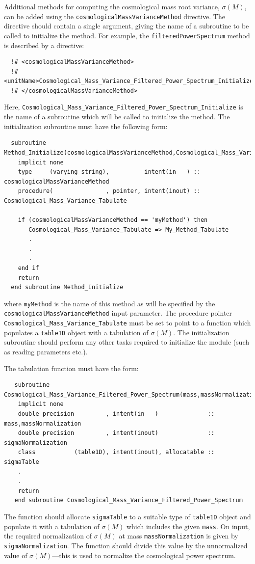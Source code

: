 Additional methods for computing the cosmological mass root variance, $\sigma(M)$, can be added using the {\tt cosmologicalMassVarianceMethod} directive. The directive should contain a single argument, giving the name of a subroutine to be called to initialize the method. For example, the {\tt filteredPowerSpectrum} method is described by a directive:
\begin{verbatim}
  !# <cosmologicalMassVarianceMethod>
  !#  <unitName>Cosmological_Mass_Variance_Filtered_Power_Spectrum_Initialize</unitName>
  !# </cosmologicalMassVarianceMethod>
\end{verbatim}
Here, {\tt Cosmological\_Mass\_Variance\_Filtered\_Power\_Spectrum\_Initialize} is the name of a subroutine which will be called to initialize the method. The initialization subroutine must have the following form:
\begin{verbatim}
  subroutine Method_Initialize(cosmologicalMassVarianceMethod,Cosmological_Mass_Variance_Tabulate)
    implicit none
    type     (varying_string),          intent(in   ) :: cosmologicalMassVarianceMethod
    procedure(               , pointer, intent(inout) :: Cosmological_Mass_Variance_Tabulate
    
    if (cosmologicalMassVarianceMethod == 'myMethod') then
       Cosmological_Mass_Variance_Tabulate => My_Method_Tabulate
       .
       .
       .
    end if
    return
  end subroutine Method_Initialize
\end{verbatim}
where {\tt myMethod} is the name of this method as will be specified by the {\tt cosmologicalMassVarianceMethod} input parameter. The procedure pointer {\tt Cosmological\_Mass\_Variance\_Tabulate} must be set to point to a function which populates a {\tt table1D} object with a tabulation of $\sigma(M)$. The initialization subroutine should perform any other tasks required to initialize the module (such as reading parameters etc.).

The tabulation function must have the form:
\begin{verbatim}
   subroutine Cosmological_Mass_Variance_Filtered_Power_Spectrum(mass,massNormalization,sigmaNormalization,sigmaTable)
    implicit none
    double precision         , intent(in   )              :: mass,massNormalization
    double precision         , intent(inout)              :: sigmaNormalization
    class           (table1D), intent(inout), allocatable :: sigmaTable
    .
    .
    return
   end subroutine Cosmological_Mass_Variance_Filtered_Power_Spectrum
\end{verbatim}
The function should allocate {\tt sigmaTable} to a suitable type of {\tt table1D} object and populate it with a tabulation of $\sigma(M)$ which includes the given {\tt mass}. On input, the required normalization of $\sigma(M)$ at mass {\tt massNormalization} is given by {\tt sigmaNormalization}. The function should divide this value by the unnormalized value of $\sigma(M)$---this is used to normalize the cosmological power spectrum.

